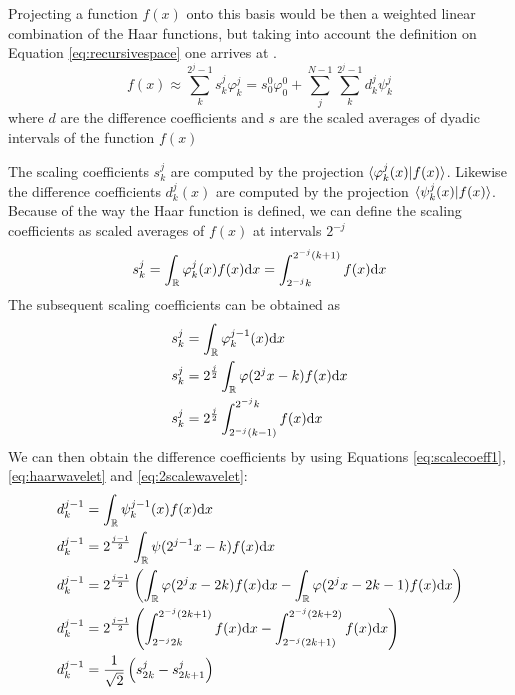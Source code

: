 \documentclass[../master_thesis.tex]{subfiles}
\begin{document}
Projecting a function $f(x)$ onto this basis would be then a weighted linear combination
of the Haar functions, but taking into account the definition on Equation \ref{eq:recursivespace} one arrives
at \cite{Sorland}.
\begin{equation}\label{eq:projectftohaar}
  f(x)\approx \sum^{2^j -1}_k s^j_k\varphi^j_k = s^0_0\varphi^0_0 + \sum^{N - 1}_j\sum^{2^j -1}_k d^j_k\psi^j_k
\end{equation}
where $d$ are the difference coefficients and $s$ are the scaled averages of dyadic intervals of the function $f(x)$

The scaling coefficients $s^j_k$ are computed by the projection $\braket{\varphi^j_k(x)|f(x)}$.
Likewise the difference coefficients $d^j_k(x)$ are computed by the projection \newline$\braket{\psi^j_k(x)|f(x)}$.
Because of the way the Haar function is defined, we can define  the scaling coefficients as
scaled averages of $f(x)$ at intervals $2^{-j}$ \cite{Sorland, Beylkin:MRA}
\begin{equation}
  s^j_k = \int_{\mathbb{R}}\varphi^j_k(x)f(x)\text{d}x = \int^{2^{-j}(k + 1)}_{2^{-j}k} f(x) \text{d}x\label{eq:scalecoeff1}
\end{equation}
The subsequent scaling coefficients can be obtained as
\begin{align}
  \begin{split}\label{eq:scalecoeffint}
    s^{j}_k &= \int_{\mathbb{R}}\varphi^{j-1}_k(x)\text{d}x\\
    s^{j}_k &= 2^{\frac{j}{2}}\int_{\mathbb{R}}\varphi(2^{j}x - k)f(x)\text{d}x\\
    s^{j}_k &= 2^{\frac{j}{2}}\int_{2^{-j}(k-1)}^{2^{-j}k}f(x)\text{d}x\\
  \end{split}
\end{align}
We can then obtain the difference coefficients by using Equations \ref{eq:scalecoeff1}, \ref{eq:haarwavelet} and \ref{eq:2scalewavelet}:
\begin{align}
  \begin{split}\label{eq:diffcoeffint}
    d^{j - 1}_k &= \int_{\mathbb{R}}\psi^{j-1}_k(x)f(x)\text{d}x\\
    d^{j - 1}_k &= 2^{\frac{j - 1}{2}}\int_{\mathbb{R}}\psi(2^{j-1}x - k)f(x)\text{d}x\\
    d^{j - 1}_k &= 2^{\frac{j - 1}{2}}\left(\int_{\mathbb{R}}\varphi(2^jx - 2k)f(x)\text{d}x  - \int_{\mathbb{R}}\varphi(2^jx - 2k - 1)f(x)\text{d}x\right)\\
    d^{j - 1}_k &= 2^{\frac{j - 1}{2}}\left( \int^{2^{-j}(2k+1)}_{2^{-j}2k}f(x)\text{d}x - \int^{2^{-j}(2k+2)}_{2^{-j}(2k + 1)}f(x)\text{d}x \right)\\
    d^{j - 1}_k &= \frac{1}{\sqrt{2}}\left(s^{j}_{2k} - s^{j}_{2k+1} \right)
  \end{split}
\end{align}
\end{document}
